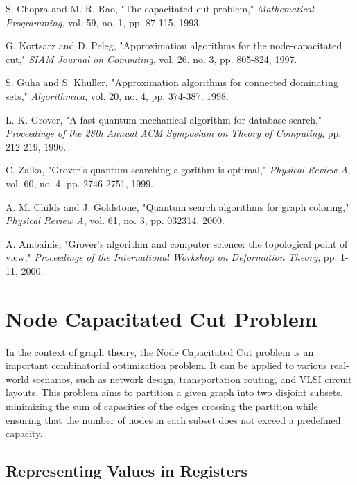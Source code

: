\begin{thebibliography}{9}

S. Chopra and M. R. Rao, "The capacitated cut problem," \emph{Mathematical Programming}, vol. 59, no. 1, pp. 87-115, 1993.

G. Kortsarz and D. Peleg, "Approximation algorithms for the node-capacitated cut," \emph{SIAM Journal on Computing}, vol. 26, no. 3, pp. 805-824, 1997.

S. Guha and S. Khuller, "Approximation algorithms for connected dominating sets," \emph{Algorithmica}, vol. 20, no. 4, pp. 374-387, 1998.

L. K. Grover, "A fast quantum mechanical algorithm for database search," \emph{Proceedings of the 28th Annual ACM Symposium on Theory of Computing}, pp. 212-219, 1996.

C. Zalka, "Grover's quantum searching algorithm is optimal," \emph{Physical Review A}, vol. 60, no. 4, pp. 2746-2751, 1999.

A. M. Childs and J. Goldstone, "Quantum search algorithms for graph coloring," \emph{Physical Review A}, vol. 61, no. 3, pp. 032314, 2000.

A. Ambainis, "Grover's algorithm and computer science: the topological point of view," \emph{Proceedings of the International Workshop on Deformation Theory}, pp. 1-11, 2000.

\end{thebibliography}

\section{Node Capacitated Cut Problem}

In the context of graph theory, the Node Capacitated Cut problem is an important combinatorial optimization problem. It can be applied to various real-world scenarios, such as network design, transportation routing, and VLSI circuit layouts. This problem aims to partition a given graph into two disjoint subsets, minimizing the sum of capacities of the edges crossing the partition while ensuring that the number of nodes in each subset does not exceed a predefined capacity.

\subsection{Representing Values in Registers}

